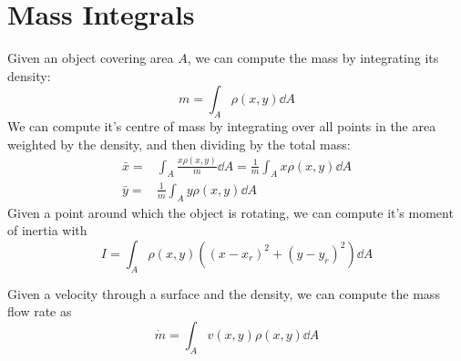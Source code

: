 \documentclass[letterpaper,11pt]{article}
\begin{document}
\section*{Mass Integrals}
Given an object covering area $A$, we can compute the mass by integrating its density:
$$
m = \int_A \rho(x, y) \dd{A}
$$
We can compute it's centre of mass by integrating over all points in the area weighted by the density, and then dividing by the total mass:
\begin{align*}
\bar{x} = &\int_A \frac{x \rho(x, y)}{m} \dd{A} = \frac{1}{m} \int_A x \rho(x, y) \dd{A}\\
\bar{y} = &\frac{1}{m} \int_A y \rho(x, y) \dd{A}
\end{align*}
Given a point around which the object is rotating, we can compute it's moment of inertia with
$$
I = \int_A \rho(x, y) ((x - x_r)^2 + (y - y_r)^2) \dd{A}
$$

Given a velocity through a surface and the density, we can compute the mass flow rate as
$$
\dot{m} = \int_A v(x, y) \rho(x, y) \dd{A}
$$
\end{document}
